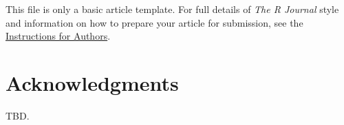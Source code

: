 This file is only a basic article template. For full details of \emph{The R Journal} style and information on how to prepare your article for submission, see the \href{https://journal.r-project.org/share/author-guide.pdf}{Instructions for Authors}.


\section{Acknowledgments}

TBD.




\address{Author One\\
  Affiliation\\
  Address\\
  Country\\
  (ORCiD if desired)\\
  }

\address{Author Two\\
  Affiliation\\
  Address\\
  Country\\
  (ORCiD if desired)\\
  }

\address{Author Three\\
  Affiliation\\
  Address\\
  Country\\
  (ORCiD if desired)\\
  }
